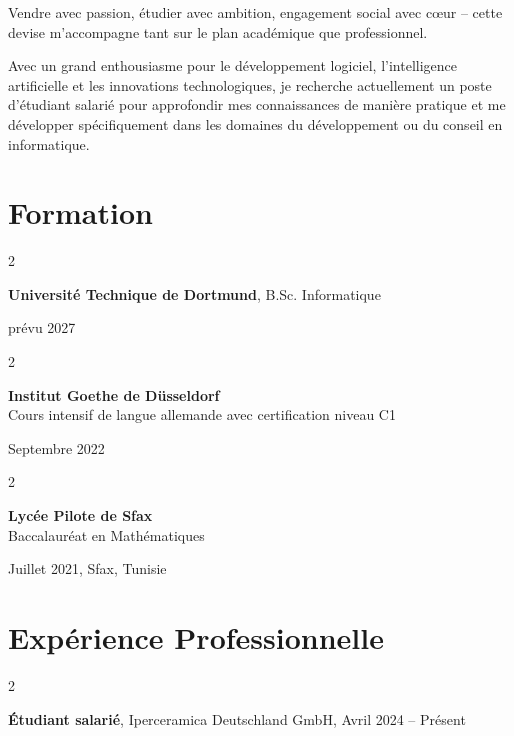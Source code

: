 \documentclass[10pt, letterpaper]{article}
\newenvironment{twocolentry}[2][]{
    \onecolentry
    \def\secondColumn{#2}
    \setcolumnwidth{\fill, 4.5 cm}
    \begin{paracol}{2}
}{
    \switchcolumn \raggedleft \secondColumn
    \end{paracol}
    \endonecolentry
} %
\begin{document}
Vendre avec passion, étudier avec ambition, engagement social avec cœur – cette devise m'accompagne tant sur le plan académique que professionnel.

Avec un grand enthousiasme pour le développement logiciel, l'intelligence artificielle et les innovations technologiques, je recherche actuellement un poste d'étudiant salarié pour approfondir mes connaissances de manière pratique et me développer spécifiquement dans les domaines du développement ou du conseil en informatique.




    
    
\section{Formation}

\begin{twocolentry}{
      prévu 2027
}
    \textbf{Université Technique de Dortmund}, B.Sc. Informatique

    \vspace{0.10 cm}
   
        
       \end{twocolentry}
             
             
\vspace{0.2 cm}
\begin{twocolentry}{
    Septembre 2022
}
    \textbf{Institut Goethe de Düsseldorf} \\
   Cours intensif de langue allemande avec certification niveau C1 
\end{twocolentry}
\vspace{0.2cm}

\begin{twocolentry}{
    Juillet 2021, Sfax, Tunisie}

    \textbf{Lycée Pilote de Sfax}\\

   
     
             Baccalauréat en Mathématiques 


\end{twocolentry}



    
    \section{Expérience Professionnelle}



        
        \begin{twocolentry}{
            Avril 2024 – Présent 
        }
            \textbf{Étudiant salarié}, Iperceramica Deutschland GmbH, \end{twocolentry}
\end{document}
